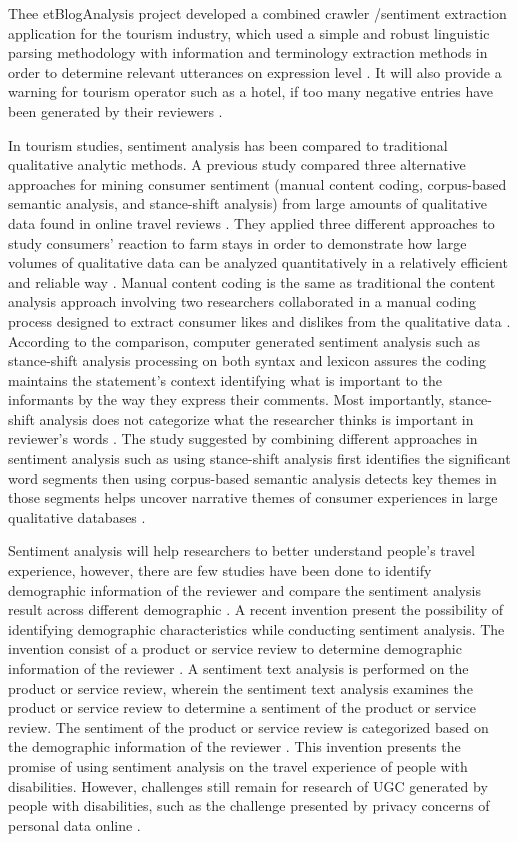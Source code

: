 Thee etBlogAnalysis project developed a combined crawler /sentiment 
extraction application for the tourism industry, which used a simple 
and robust linguistic parsing methodology with information and 
terminology extraction methods in order to determine relevant utterances 
on expression level \cite{opinion2014}. It will also provide a warning 
for tourism operator such as a hotel, if too many negative entries have 
been generated by their reviewers \cite{Garcia2012}.

In tourism studies, sentiment analysis has been compared to traditional 
qualitative analytic methods. A previous study compared three alternative 
approaches for mining consumer sentiment (manual content coding, corpus-based 
semantic analysis, and stance-shift analysis) from large amounts of qualitative 
data found in online travel reviews \cite{Farm,claster}. They applied three different
approaches to study consumers' reaction to farm stays in order to demonstrate 
how large volumes of qualitative data can be analyzed quantitatively in a 
relatively efficient and reliable way \cite{Garcia2012}.  Manual content coding is 
the same as traditional the content analysis approach involving two researchers 
collaborated in a manual coding process designed to extract consumer likes 
and dislikes from the qualitative data \cite{Garcia2009}. According to the comparison, 
computer generated sentiment analysis such as stance-shift analysis processing 
on both syntax and lexicon assures the coding maintains the statement's context 
identifying what is important to the informants by the way they express their 
comments. Most importantly, stance-shift analysis does not categorize what the 
researcher thinks is important in reviewer's words \cite{Farm}. The study suggested 
by combining different approaches in sentiment analysis such as using stance-shift 
analysis first identifies the significant word segments then using corpus-based 
semantic analysis detects key themes in those segments helps uncover narrative 
themes of consumer experiences in large qualitative databases \cite{Farm}.

Sentiment analysis will help researchers to better understand people's travel 
experience, however, there are few studies have been done to identify 
demographic information of the reviewer and compare the sentiment analysis 
result across different demographic \cite{article}. A recent invention present the possibility 
of identifying demographic characteristics while conducting sentiment analysis. 
The invention consist of a product or service review to determine demographic 
information of the reviewer \cite{Bhatt2014}. A sentiment text analysis is 
performed on the product or service review, wherein the sentiment text analysis 
examines the product or service review to determine a sentiment of the product or 
service review. The sentiment of the product or service review is categorized 
based on the demographic information of the reviewer \cite{Bhatt2014}. This 
invention presents the promise of using sentiment analysis on the travel 
experience of people with disabilities. However, challenges still remain 
for research of UGC generated by people with disabilities, such as the 
challenge presented by privacy concerns of personal data online \cite{lazar}. 


